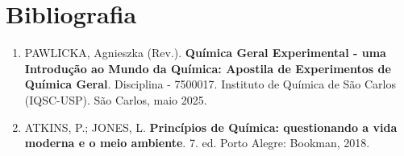 \section{Bibliografia}
\begin{enumerate}
    \item[1] PAWLICKA, Agnieszka (Rev.). \textbf{Química Geral Experimental - uma Introdução ao Mundo da Química: Apostila de Experimentos de Química Geral}. Disciplina - 7500017. Instituto de Química de São Carlos (IQSC-USP). São Carlos, maio 2025.
    \item[2] ATKINS, P.; JONES, L. \textbf{Princípios de Química: questionando a vida moderna e o meio ambiente}. 7. ed. Porto Alegre: Bookman, 2018.
\end{enumerate}
